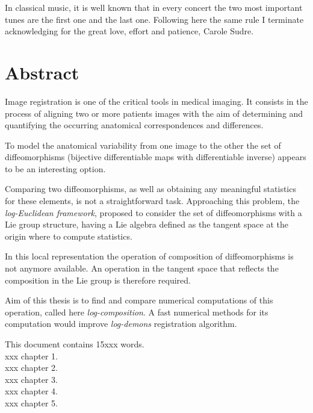 In classical music, it is well known that in every concert the two most important tunes are the first one and the last one. Following here the same rule I terminate acknowledging for the great love, effort and patience, Carole Sudre.


\qquad
\pagestyle{empty}
\newpage


\section*{Abstract}

Image registration is one of the critical tools in medical imaging. It consists in the process of aligning two or more patients images with the aim of determining and quantifying the occurring anatomical correspondences and differences. 

To model the anatomical variability from one image to the other the set of diffeomorphisms (bijective differentiable maps with differentiable inverse) appears to be an interesting option.

Comparing two diffeomorphisms, as well as obtaining any meaningful statistics for these elements, is not a straightforward task.
Approaching this problem, the \emph{log-Euclidean framework}, proposed to consider the set of diffeomorphisms with a Lie group structure, having a Lie algebra defined as the tangent space at the origin where to compute statistics.

In this local representation the operation of composition of diffeomorphisms is not anymore available. An operation in the tangent space that reflects the composition in the Lie group is therefore required.

Aim of this thesis is to find and compare numerical computations of this operation, called here \emph{log-composition}. 
A fast numerical methods for its computation would improve \emph{log-demons} registration algorithm.


\begin{flushright}
This document contains 15xxx words. \\
xxx chapter 1. \\
xxx chapter 2. \\
xxx chapter 3. \\
xxx chapter 4. \\
xxx chapter 5. 
\end{flushright}

